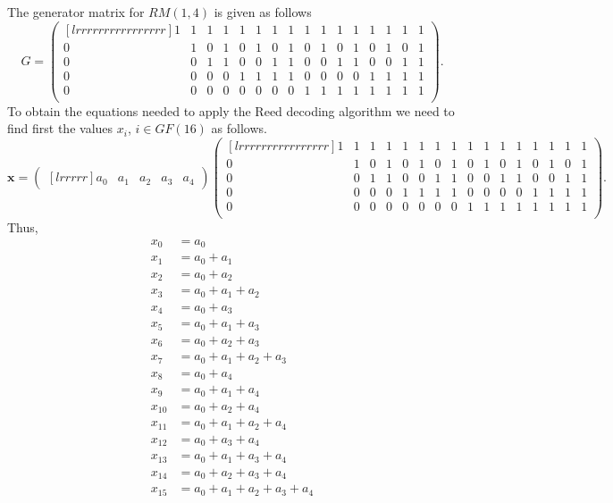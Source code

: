 The generator matrix for $RM(1, 4)$ is given as  follows
\[
G = 
\begin{pmatrix}[lrrrrrrrrrrrrrrrr]
1 &1 &1 &1 &1 &1 &1 &1 &1 &1 &1 &1 &1 &1 &1 &1 \\
0 &1 &0 &1 &0 &1 &0 &1 &0 &1 &0 &1 &0 &1 &0 &1 \\
0 &0 &1 &1 &0 &0 &1 &1 &0 &0 &1 &1 &0 &0 &1 &1 \\
0 &0 &0 &0 &1 &1 &1 &1 &0 &0 &0 &0 &1 &1 &1 &1 \\
0 &0 &0 &0 &0 &0 &0 &0 &1 &1 &1 &1 &1 &1 &1 &1 \\
\end{pmatrix}.
\]
To obtain the equations needed to apply the Reed decoding algorithm we need to find first the values $x_i$,  $i\in GF(16)$ as follows.
\[
	\bm{x}=
	\begin{pmatrix}[lrrrrr]
	a_0 & a_1 & a_2 & a_3 & a_4 
	\end{pmatrix}
	\begin{pmatrix}[lrrrrrrrrrrrrrrrr]
     1 &1 &1 &1 &1 &1 &1 &1 &1 &1 &1 &1 &1 &1 &1 &1 \\
     0 &1 &0 &1 &0 &1 &0 &1 &0 &1 &0 &1 &0 &1 &0 &1 \\
     0 &0 &1 &1 &0 &0 &1 &1 &0 &0 &1 &1 &0 &0 &1 &1 \\
     0 &0 &0 &0 &1 &1 &1 &1 &0 &0 &0 &0 &1 &1 &1 &1 \\
     0 &0 &0 &0 &0 &0 &0 &0 &1 &1 &1 &1 &1 &1 &1 &1 \\
    \end{pmatrix}.
\]
Thus,
\begin{align}
\label{eq:x0}
	x_0 &= a_0\\
	\label{eq:x1}
	x_1 &= a_0 + a_1\\
	\label{eq:x2}
	x_2 &= a_0 + a_2\\
	\label{eq:x3}
	x_3 &= a_0 + a_1 + a_2\\
	\label{eq:x4}
	x_4 &= a_0 + a_3\\
	\label{eq:x5}
	x_5 &= a_0 + a_1 + a_3\\
	\label{eq:x6}
	x_6 &= a_0 + a_2 + a_3\\
	\label{eq:x7}
	x_7 &= a_0 + a_1 + a_2 + a_3\\
	\label{eq:x8}
	x_8 &= a_0 + a_4\\
	\label{eq:x9}
	x_9 &= a_0 + a_1 + a_4\\
	\label{eq:x10}
	x_{10} &= a_0 + a_2 + a_4\\
	\label{eq:x11}
	x_{11} &= a_0 + a_1 + a_2 + a_4\\
	\label{eq:x12}
	x_{12} &= a_0 + a_3 + a_4\\
	\label{eq:x13}
	x_{13} &= a_0 + a_1 + a_3 +a_4\\
	\label{eq:314}
	x_{14} &= a_0 + a_2 +a_3 + a_4\\
	\label{eq:x15}
	x_{15} &= a_0 + a_1 + a_2 + a_3 + a_4
\end{align}
